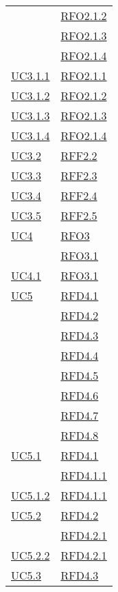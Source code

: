 \begin{longtable}{|>{\centering}m{5cm}|m{5cm}<{\centering}|}
& \hyperlink{RFO2.1.2}{RFO2.1.2}\\
& \hyperlink{RFO2.1.3}{RFO2.1.3}\\
& \hyperlink{RFO2.1.4}{RFO2.1.4}\\ \hline
\hyperref[UC3.1.1]{UC3.1.1} & \hyperlink{RFO2.1.1}{RFO2.1.1}\\ \hline
\hyperref[UC3.1.2]{UC3.1.2} & \hyperlink{RFO2.1.2}{RFO2.1.2}\\ \hline
\hyperref[UC3.1.3]{UC3.1.3} & \hyperlink{RFO2.1.3}{RFO2.1.3}\\ \hline
\hyperref[UC3.1.4]{UC3.1.4} & \hyperlink{RFO2.1.4}{RFO2.1.4}\\ \hline
\hyperref[UC3.2]{UC3.2} & \hyperlink{RFF2.2}{RFF2.2}\\ \hline
\hyperref[UC3.3]{UC3.3} & \hyperlink{RFF2.3}{RFF2.3}\\ \hline
\hyperref[UC3.4]{UC3.4} & \hyperlink{RFF2.4}{RFF2.4}\\ \hline
\hyperref[UC3.5]{UC3.5} & \hyperlink{RFF2.5}{RFF2.5}\\ \hline
\hyperref[UC4]{UC4} & \hyperlink{RFO3}{RFO3}\\
& \hyperlink{RFO3.1}{RFO3.1}\\ \hline
\hyperref[UC4.1]{UC4.1} & \hyperlink{RFO3.1}{RFO3.1}\\ \hline
\hyperref[UC5]{UC5} & \hyperlink{RFD4.1}{RFD4.1}\\
& \hyperlink{RFD4.2}{RFD4.2}\\
& \hyperlink{RFD4.3}{RFD4.3}\\
& \hyperlink{RFD4.4}{RFD4.4}\\
& \hyperlink{RFD4.5}{RFD4.5}\\
& \hyperlink{RFD4.6}{RFD4.6}\\
& \hyperlink{RFD4.7}{RFD4.7}\\
& \hyperlink{RFD4.8}{RFD4.8}\\ \hline
\hyperref[UC5.1]{UC5.1} & \hyperlink{RFD4.1}{RFD4.1}\\
& \hyperlink{RFD4.1.1}{RFD4.1.1}\\ \hline
\hyperref[UC5.1.2]{UC5.1.2} & \hyperlink{RFD4.1.1}{RFD4.1.1}\\ \hline
\hyperref[UC5.2]{UC5.2} & \hyperlink{RFD4.2}{RFD4.2}\\
& \hyperlink{RFD4.2.1}{RFD4.2.1}\\ \hline
\hyperref[UC5.2.2]{UC5.2.2} & \hyperlink{RFD4.2.1}{RFD4.2.1}\\ \hline
\hyperref[UC5.3]{UC5.3} & \hyperlink{RFD4.3}{RFD4.3}\\

\end{longtable}
